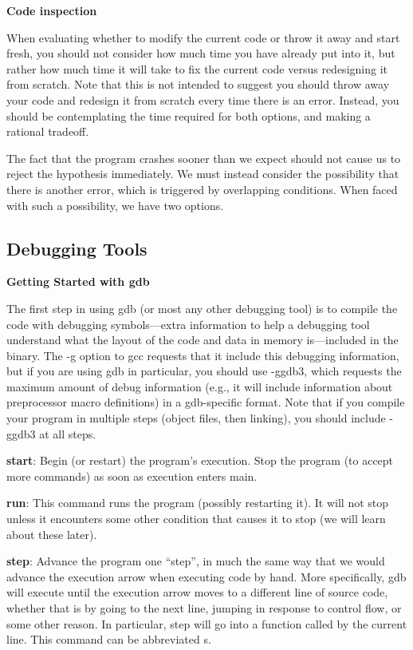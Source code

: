 \documentclass[11pt, a4paper]{article}
\begin{document}
\textbf{Code inspection}

When evaluating whether to modify the current code or throw it away and start fresh, you should not consider how much time you have already put into it, but rather how much time it will take to fix the current code versus redesigning it from scratch. Note that this is not intended to suggest you should throw away your code and redesign it from scratch every time there is an error. Instead, you should be contemplating the time required for both options, and making a rational tradeoff.


The fact that the program crashes sooner than we expect should not cause us to reject the hypothesis immediately. We must instead consider the possibility that there is another error, which is triggered by overlapping conditions. When faced with such a possibility, we have two options.





\subsection{Debugging Tools}%
\label{sub:debugging_tools}


\textbf{Getting Started with gdb}

The first step in using gdb (or most any other debugging tool) is to compile the code with debugging symbols—extra information to help a debugging tool understand what the layout of the code and data in memory is—included in the binary. The -g option to gcc requests that it include this debugging information, but if you are using gdb in particular, you should use -ggdb3, which requests the maximum amount of debug information (e.g., it will include information about preprocessor macro definitions) in a gdb-specific format. Note that if you compile your program in multiple steps (object files, then linking), you should include -ggdb3 at all steps.


\textbf{start}: Begin (or restart) the program’s execution. Stop the program (to accept more commands) as soon as execution enters main.

\textbf{run}: This command runs the program (possibly restarting it). It will not stop unless it encounters some other condition that causes it to stop (we will learn about these later).

\textbf{step}: Advance the program one “step”, in much the same way that we would advance the execution arrow when executing code by hand. More specifically, gdb will execute until the execution arrow moves to a different line of source code, whether that is by going to the next line, jumping in response to control flow, or some other reason. In particular, step will go into a function called by the current line. This command can be abbreviated s.
\end{document}
